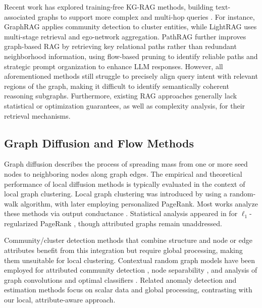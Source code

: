 \documentclass{article} %
\begin{document}
Recent work has explored training-free KG-RAG methods, building text-associated graphs to support more complex and multi-hop queries \citep{edge2024graphrag,guo2024lightrag}. For instance, GraphRAG \citep{edge2024graphrag} applies community detection to cluster entities, while LightRAG \citep{guo2024lightrag} uses multi-stage retrieval and ego-network aggregation. PathRAG \citep{chen2025pathrag} further improves graph-based RAG by retrieving key relational paths rather than redundant neighborhood information, using flow-based pruning to identify reliable paths and strategic prompt organization to enhance LLM responses. However, all aforementioned methods still struggle to precisely align query intent with relevant regions of the graph, making it difficult to identify semantically coherent reasoning subgraphs. Furthermore, existing RAG approaches generally lack statistical or optimization guarantees, as well as complexity analysis, for their retrieval mechanisms.

\subsection{Graph Diffusion and Flow Methods}
Graph diffusion describes the process of spreading mass from one or more seed nodes to neighboring nodes along graph edges. The empirical and theoretical performance of local diffusion methods is typically evaluated in the context of local graph clustering. Local graph clustering was introduced by \citet{SH13} using a random-walk algorithm, with \citet{ACL06} later employing personalized PageRank. Most works analyze these methods via output conductance \citep{ACL06,AP09,SH13,ALM13,AGPT2016,PKDJ17,WFHM2017,FWY20,LG20}. Statistical analysis appeared in \citet{HFM2021} for $\ell_1$-regularized PageRank \citep{FKSCM2017}, though attributed graphs remain unaddressed. 

Community/cluster detection methods that combine structure and node or edge attributes \citep{YML13,jia2017node,zhe2019community,sun2020network} benefit from this integration but require global processing, making them unsuitable for local clustering. Contextual random graph models have been employed for attributed community detection \citep{DSMM18,YS2021,BTB22,AFW22}, node separability \citep{BFJ2021,FLYBJ22,BFJ23}, and analysis of graph convolutions and optimal classifiers \citep{wu2023an,wei2022understanding,baranwal2023optimality}. Related anomaly detection \citep{arias2008searching,arias2011detection,sharpnack2013near,qian2014efficient} and estimation \citep{chitra2021quantifying} methods focus on scalar data and global processing, contrasting with our local, attribute-aware approach.
\end{document}
